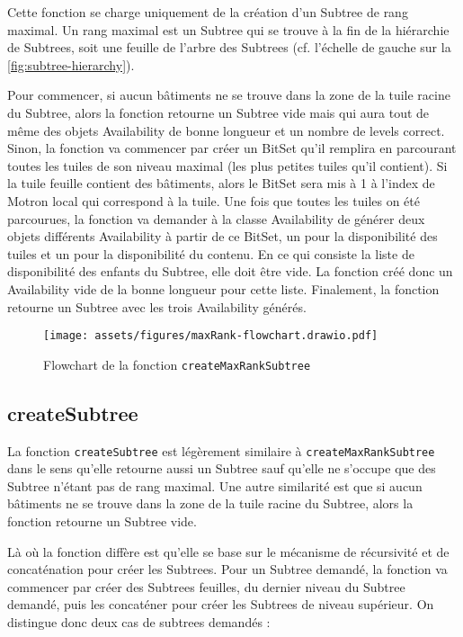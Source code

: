 Cette fonction se charge uniquement de la création d'un Subtree de rang maximal. Un rang maximal est un Subtree qui se trouve à la fin de la hiérarchie de Subtrees, soit une feuille de l'arbre des Subtrees (cf. l'échelle de gauche sur la \autoref{fig:subtree-hierarchy}).

Pour commencer, si aucun bâtiments ne se trouve dans la zone de la tuile racine du Subtree, alors la fonction retourne un Subtree vide mais qui aura tout de même des objets Availability de bonne longueur et un nombre de levels correct. Sinon, la fonction va commencer par créer un BitSet qu'il remplira en parcourant toutes les tuiles de son niveau maximal (les plus petites tuiles qu'il contient). Si la tuile feuille contient des bâtiments, alors le BitSet sera mis à 1 à l'index de Motron local qui correspond à la tuile. Une fois que toutes les tuiles on été parcourues, la fonction va demander à la classe Availability de générer deux objets différents Availability à partir de ce BitSet, un pour la disponibilité des tuiles et un pour la disponibilité du contenu. En ce qui consiste la liste de disponibilité des enfants du Subtree, elle doit être vide. La fonction créé donc un Availability vide de la bonne longueur pour cette liste. Finalement, la fonction retourne un Subtree avec les trois Availability générés.

\begin{figure}[H]
    \centering
    \texttt{[image: assets/figures/maxRank-flowchart.drawio.pdf]}
    \caption{Flowchart de la fonction \texttt{createMaxRankSubtree}}
    \label{fig:maxrank-flowchart}
\end{figure}

\newpage
\subsection*{createSubtree}

La fonction \texttt{createSubtree} est légèrement similaire à \texttt{createMaxRankSubtree} dans le sens qu'elle retourne aussi un Subtree sauf qu'elle ne s'occupe que des Subtree n'étant pas de rang maximal. Une autre similarité est que si aucun bâtiments ne se trouve dans la zone de la tuile racine du Subtree, alors la fonction retourne un Subtree vide.

Là où la fonction diffère est qu'elle se base sur le mécanisme de récursivité et de concaténation pour créer les Subtrees. Pour un Subtree demandé, la fonction va commencer par créer des Subtrees feuilles, du dernier niveau du Subtree demandé, puis les concaténer pour créer les Subtrees de niveau supérieur. On distingue donc deux cas de subtrees demandés :

